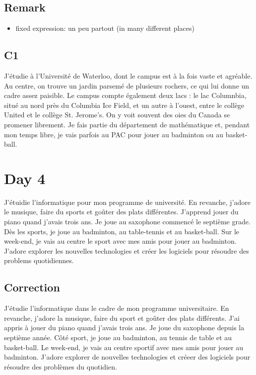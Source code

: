 \documentclass{book}
\begin{document}
    \subsection{Remark}
        \begin{itemize}
            \item fixed expression: un peu partout (in many different places)
        \end{itemize}

    \subsection{C1}
        J'étudie à l'Université de Waterloo, dont le campus est à la fois vaste et agréable.
        Au centre, on trouve un jardin parsemé de plusieurs rochers, ce qui lui donne un cadre assez paisible.
        Le campus compte également deux lacs : le lac Columnbia, situé au nord près du Columbia Ice Field, et un autre à l'ouest, entre le collège United et le collège St. Jerome's.
        On y voit souvent des oies du Canada se promener librement. 
        Je fais partie du département de mathématique et, pendant mon temps libre, je vais parfois au PAC pour jouer au badminton ou au basket-ball.

\section{Day 4}
    J'étuidie l'informatique pour mon programme de université. 
    En revanche, j'adore le musique, faire du sports et goûter des plats différentes.
    J'apprend jouer du piano quand j'avais trois ans. Je joue au saxophone commencé le septième grade.
    Dès les sports, je joue au badminton, au table-tennis et au basket-ball.
    Sur le week-end, je vais au centre le sport avec mes amis pour jouer au badminton.
    J'adore explorer les nouvelles technologies et créer les logiciels pour résoudre des problems quotidiennes.

    \subsection{Correction}
        J'étudie l'informatique dans le cadre de mon programme universitaire.
        En revanche, j'adore la musique, faire du sport et goûter des plats différents.
        J'ai appris à jouer du piano quand j'avais trois ans.
        Je joue du saxophone depuis la septième année.
        Côté sport, je joue au badminton, au tennis de table et au basket-ball.
        Le week-end, je vais au centre sportif avec mes amis pour jouer au badminton.
        J'adore explorer de nouvelles technologies et créeer des logiciels pour résoudre des problèmes du quotidien.
\end{document}
